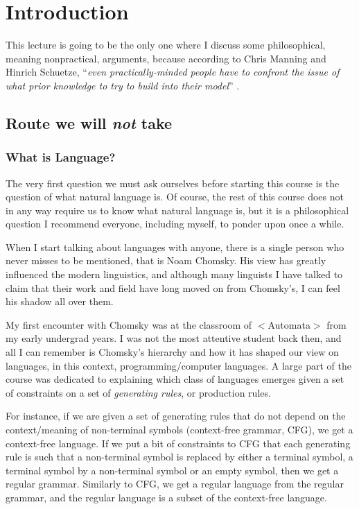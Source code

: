 \documentclass{report}
\begin{document}
\tableofcontents

\chapter{Introduction}
\label{chap:intro}

This lecture is going to be the only one where I discuss some philosophical,
meaning nonpractical, arguments, because according to Chris Manning and Hinrich
Schuetze, ``{\it even practically-minded people have to confront the issue of
what prior knowledge to try to build into their model}''
\cite{manning1999foundations}. 

\section{Route we will {\it not} take}
\label{sec:wrong_route}

\subsection{What is Language?}

The very first question we must ask ourselves before starting this course is the
question of what natural language is. Of course, the rest of this course does
not in any way require us to know what natural language is, but it is a
philosophical question I recommend everyone, including myself, to ponder upon
once a while. 

When I start talking about languages with anyone, there is a single person who
never misses to be mentioned, that is Noam Chomsky. His view has greatly
influenced the modern linguistics, and although many linguists I have talked to
claim that their work and field have long moved on from Chomsky's, I can feel
his shadow all over them. 

My first encounter with Chomsky was at the classroom of $<$Automata$>$ from my
early undergrad years. I was not the most attentive student back then, and all I
can remember is Chomsky's hierarchy and how it has shaped our view on languages,
in this context, programming/computer languages.  A large part of the course was
dedicated to explaining which class of languages emerges given a set of
constraints on a set of {\it generating rules}, or production rules. 

For instance, if we are given a set of generating rules that do not depend on
the context/meaning of non-terminal symbols (context-free grammar, CFG), we get
a context-free language. If we put a bit of constraints to CFG that each
generating rule is such that a non-terminal symbol is replaced by either a
terminal symbol, a terminal symbol by a non-terminal symbol or an empty symbol,
then we get a regular grammar. Similarly to CFG, we get a regular language from
the regular grammar, and the regular language is a subset of the context-free
language.
\end{document}

